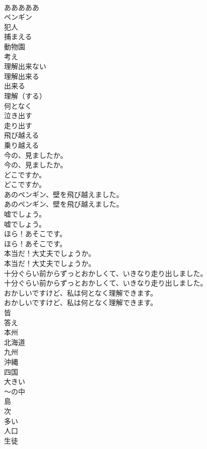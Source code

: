 \documentclass[8pt]{extreport}
\begin{document}
\begin{CJK}{UTF8}{min}
\\	あああああ　 
\\	ペンギン
\\	犯人
\\	捕まえる
\\	動物園
\\	考え
\\	理解出来ない
\\	理解出来る
\\	出来る
\\	理解（する）
\\	何となく
\\	泣き出す
\\	走り出す
\\	飛び越える
\\	乗り越える
\\	今の、見ましたか。	
\\	今の、見ましたか。 
\\	どこですか。	
\\	どこですか。 
\\	あのペンギン、壁を飛び越えました。	
\\	あのペンギン、壁を飛び越えました。 
\\	嘘でしょう。	
\\	嘘でしょう。 
\\	ほら！あそこです。	
\\	ほら！あそこです。 
\\	本当だ！大丈夫でしょうか。	
\\	本当だ！大丈夫でしょうか。 
\\	十分ぐらい前からずっとおかしくて、いきなり走り出しました。	
\\	十分ぐらい前からずっとおかしくて、いきなり走り出しました。 
\\	おかしいですけど、私は何となく理解できます。	
\\	おかしいですけど、私は何となく理解できます。 
\\	皆
\\	答え
\\	本州
\\	北海道
\\	九州
\\	沖縄
\\	四国
\\	大きい
\\	～の中
\\	島
\\	次
\\	多い
\\	人口
\\	生徒

\end{CJK}
\end{document}
